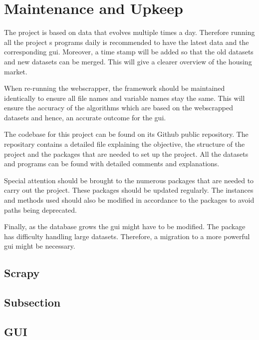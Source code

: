 \documentclass[main]{subfiles}
\begin{document}
\section{Maintenance and Upkeep}
The project is based on data that evolves multiple times a day. 
Therefore running all the project s programs daily is recommended to have the latest data and the corresponding \ac{gui}. 
Moreover, a time stamp will be added so that the old datasets and new datasets can be merged. 
This will give a clearer overview of the housing market. \par
When re-running the webscrapper, the framework should be maintained identically to ensure all file names and variable names stay the same. 
This will ensure the accuracy of the algorithms which are based on the webscrapped datasets and hence, an accurate outcome for the \ac{gui}. \par
The codebase for this project can be found on its Github public repository. 
The repositary contains a detailed \pkg[readme.md] file explaining the objective, the structure of the project and the packages that are needed to set up the project. 
All the datasets and programs can be found with detailed comments and explanations.\par
Special attention should be brought to the numerous packages that are needed to carry out the project. 
These packages should be updated regularly. The instances and methods used should also be modified in accordance to the packages to avoid paths being deprecated.\par
Finally, as the database grows the \ac{gui} might have to be modified. The \pkg[tkinter] package has difficulty handling large datasets.
Therefore, a migration to a more powerful \ac{gui} might be necessary.

\subsection{Scrapy}
\subsection{Subsection}

\subsection{GUI}
\end{document}
